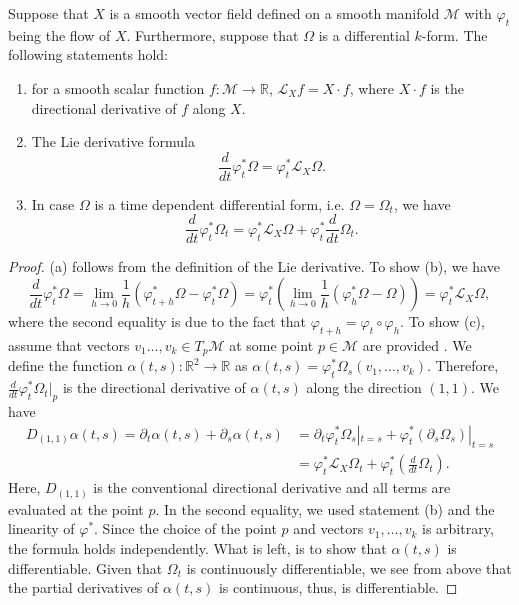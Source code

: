 \begin{theorem} \label{theorem:2.3}
Suppose that $X$ is a smooth vector field defined on a smooth manifold $\mathcal M$ with $\varphi_t$ being the flow of $X$. Furthermore, suppose that $\Omega$ is a differential $k$-form. The following statements hold:
\begin{enumerate} [label=(\alph*)]
\item for a smooth scalar function $f:\mathcal M \to \mathbb R$, $\mathcal L_X f = X\cdot f$, where $X \cdot f$ is the directional derivative of $f$ along $X$.
\item The Lie derivative formula
\[
	\frac{d}{dt} \varphi^*_t \Omega = \varphi^*_t \mathcal L_X \Omega.
\]
\item In case $\Omega$ is a time dependent differential form, i.e. $\Omega = \Omega_t$, we have
\[
	\frac{d}{dt} \varphi^*_t \Omega_t = \varphi^*_t \mathcal L_X \Omega + \varphi^*_t \frac{d}{dt} \Omega_t.
\]
\end{enumerate}
\end{theorem}
\begin{proof}
(a) follows from the definition of the Lie derivative. To show (b), we have
\begin{equation} \label{eq:2.11}
	\frac{d}{dt} \varphi^*_t \Omega = \lim_{h\to 0} \frac 1 h( \varphi^*_{t+h} \Omega - \varphi^*_t \Omega ) = \varphi^*_t (\lim_{h\to 0} \frac 1 h (\varphi^*_{h} \Omega - \Omega) ) = \varphi^*_t \mathcal L_X \Omega,
\end{equation}
where the second equality is due to the fact that $\varphi_{t+h} = \varphi_t \circ \varphi_h$. To show (c), assume that vectors $v_1\dots,v_k\in T_{p}\mathcal M$ at some point $p\in \mathcal M$ are provided . We define the function $\alpha(t,s):\mathbb R^2 \to \mathbb R$ as $\alpha(t,s) = \varphi_t^*\Omega_s(v_1,\dots,v_k)$. Therefore, $\frac{d}{dt} \varphi^*_t \Omega_t|_p$ is the directional derivative of $\alpha(t,s)$ along the direction $(1,1)$. We have
\begin{equation} \label{eq:2.12}
\begin{aligned}
	D_{(1,1)} \alpha(t,s) = \partial_t \alpha(t,s) + \partial_s  \alpha(t,s) &= \partial_t \varphi^*_t \Omega_s|_{t=s} + \varphi^*_t (\partial_s \Omega_s)|_{t=s} \\
	&= \varphi^*_t \mathcal L_X \Omega_t + \varphi^*_t (\frac{d}{dt} \Omega_t).
\end{aligned}
\end{equation}
Here, $D_{(1,1)}$ is the conventional directional derivative and all terms are evaluated at the point $p$. In the second equality, we used statement (b) and the linearity of $\varphi^*$. Since the choice of the point $p$ and vectors $v_1,\dots,v_k$ is arbitrary, the formula holds independently. What is left, is to show that $\alpha(t,s)$ is differentiable. Given that $\Omega_t$ is continuously differentiable, we see from above that the partial derivatives of $\alpha(t,s)$ is continuous, thus, is differentiable. 
\end{proof}


